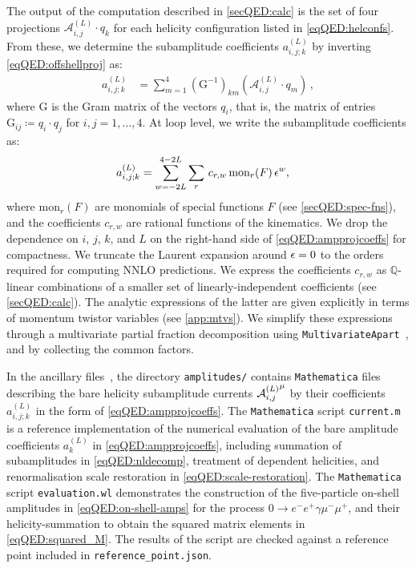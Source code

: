 \documentclass[main.tex]{subfiles}
\begin{document}
The output of the computation described in \cref{secQED:calc} is the set of four projections $\mathcal{A}^{(L)}_{i,j} \cdot q_k$ for each helicity configuration listed in \cref{eqQED:helconfs}.
From these, we determine the subamplitude coefficients $a_{i,j;k}^{(L)}$ by inverting \cref{eqQED:offshellproj} as:
\begin{align}
    \label{eqQED:ampcoeffinv}
    a_{i,j ; k}^{(L)} &= \sum_{m=1}^4 \left(\mathrm{G}^{-1}\right)_{km} \left(\mathcal{A}^{(L)}_{i,j} \cdot q_m\right) \,,
\end{align}
where $\mathrm{G}$ is the Gram matrix of the vectors $q_i$, that is, the matrix of entries $\mathrm{G}_{ij} \coloneqq q_i \cdot q_j$ for $i,j=1,\ldots,4$.
At loop level, we write the subamplitude coefficients as:
\begin{align}
    \label{eqQED:ampprojcoeffs}
    a_{i,j;k}^{(L)} &= \sum_{w=-2L}^{4-2L} \sum_r\,c_{r,w}\,\text{mon}_r(F)\,\epsilon^w ,
\end{align}
where $\text{mon}_r(F)$ are monomials of special functions $F$ (see \cref{secQED:spec-fns}), and the coefficients $c_{r,w}$ are rational functions of the kinematics. 
We drop the dependence on $i$, $j$, $k$, and $L$ on the right-hand side of \cref{eqQED:ampprojcoeffs} for compactness. 
We truncate the Laurent expansion around $\epsilon=0$ to the orders required for computing \ac{NNLO} predictions.
We express the coefficients $c_{r,w}$ as $\mathbb{Q}$-linear combinations of a smaller set of linearly-independent coefficients (see \cref{secQED:calc}).
The analytic expressions of the latter are given explicitly in terms of momentum twistor variables (see \cref{app:mtvs}).
We simplify these expressions through a multivariate partial fraction decomposition using \texttt{MultivariateApart}~\cite{Heller:2021qkz}, and by collecting the common factors.

In the ancillary files~\cite{zenodo}, the directory \texttt{amplitudes/} contains \texttt{Mathematica} files describing the bare helicity subamplitude currents ${\mathcal{A}^{(L)}_{i, j}}^{\mu}$ by their coefficients $a_{i,j;k}^{(L)}$ in the form of \cref{eqQED:ampprojcoeffs}.
The \texttt{Mathematica} script \texttt{current.m} is a reference implementation of the numerical evaluation of the bare amplitude coefficients $a_k^{(L)}$ in \cref{eqQED:ampprojcoeffs}, including summation of subamplitudes in \cref{eqQED:nldecomp}, treatment of dependent helicities, and renormalisation scale restoration in \cref{eqQED:scale-restoration}.
The \texttt{Mathematica} script \texttt{evaluation.wl} demonstrates the construction of the five-particle on-shell amplitudes in \cref{eqQED:on-shell-amps} for the process $0\to e^- e^+ \gamma \mu^- \mu^+$, and their helicity-summation to obtain the squared matrix elements in \cref{eqQED:squared_M}.
The results of the script are checked against a reference point included in \texttt{reference\_point.json}.
\end{document}
